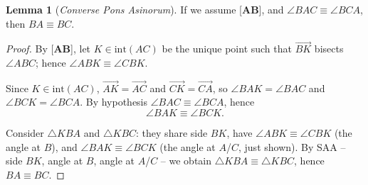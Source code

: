 \documentclass[11pt,a4paper]{article}
\theoremstyle{definition}
\newtheorem{lem}[thm]{Lemma}
\theoremstyle{remark}
\numberwithin{equation}{section}
\begin{document}
\begin{lem}[\emph{Converse Pons Asinorum}]\label{PEN2_PA_CONV}
If we assume [\textbf{AB}], and $\angle BAC\equiv\angle BCA$, then $BA\equiv BC$.
\end{lem}
\begin{proof}
By [\textbf{AB}], let $K\in\mathrm{int}(AC)$ be the unique point such that
$\overrightarrow{BK}$ bisects $\angle ABC$; hence $\angle ABK\equiv\angle CBK$.

Since $K\in\mathrm{int}(AC)$, $\overrightarrow{AK}=\overrightarrow{AC}$ and
$\overrightarrow{CK}=\overrightarrow{CA}$, so $\angle BAK=\angle BAC$ and
$\angle BCK=\angle BCA$. By hypothesis $\angle BAC\equiv\angle BCA$, hence
\begin{equation*}
\angle BAK\equiv\angle BCK.
\end{equation*}

Consider $\triangle KBA$ and $\triangle KBC$: they share side $BK$, have
$\angle ABK\equiv\angle CBK$ (the angle at $B$), and $\angle BAK\equiv\angle BCK$ (the angle
at $A$/$C$, just shown). By SAA -- side $BK$, angle at $B$, angle at $A$/$C$ -- we obtain
$\triangle KBA\equiv\triangle KBC$, hence $BA\equiv BC$.
\end{proof}
\end{document}
